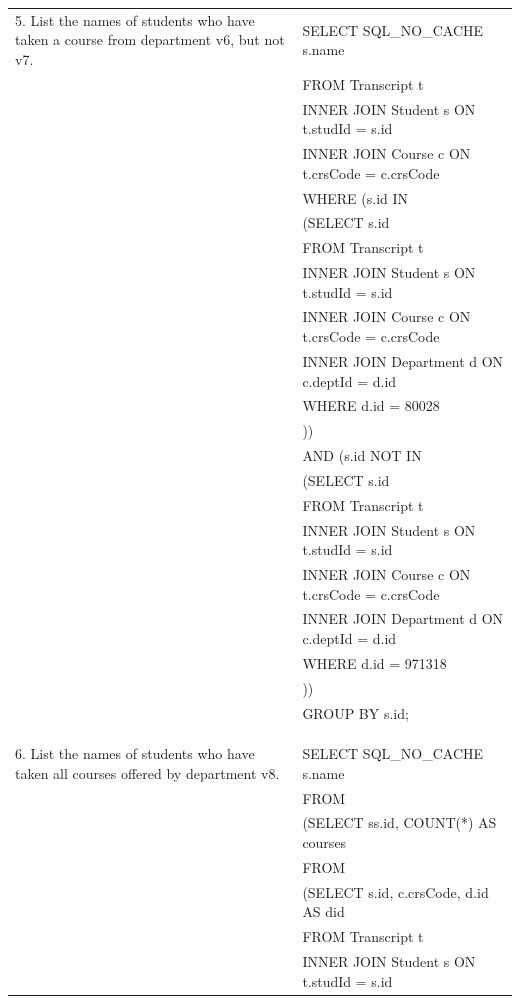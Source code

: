 \documentclass[11pt]{report}
\newcommand\tab[1][1cm]{\hspace*{#1}}
\begin{document}
	\begin{flushleft}
		\begin{tabular}{m{15em}|m{27.5em}}
			\multirow{1}{15em}{5. List the names of students who have taken a course from 
			department v6, but not v7.} 
			& SELECT SQL\_NO\_CACHE s.name \\ 
			& FROM Transcript t \\ 
			& INNER JOIN Student s ON t.studId = s.id \\
			& INNER JOIN Course c ON t.crsCode = c.crsCode \\
			& WHERE (s.id IN  \\
			& \tab (SELECT s.id \\
			& \tab FROM Transcript t \\
			& \tab INNER JOIN Student s ON t.studId = s.id \\
			& \tab INNER JOIN Course c ON t.crsCode = c.crsCode \\
			& \tab INNER JOIN Department d ON c.deptId = d.id \\
			& \tab WHERE d.id = 80028 \\
			& \tab )) \\
			& \tab AND (s.id NOT IN \\
			& \tab (SELECT s.id \\
			& \tab FROM Transcript t \\
			& \tab INNER JOIN Student s ON t.studId = s.id \\
			& \tab INNER JOIN Course c ON t.crsCode = c.crsCode \\
			& \tab INNER JOIN Department d ON c.deptId = d.id \\
			& \tab WHERE d.id = 971318 \\
			& \tab)) \\
			& GROUP BY s.id; \\
			&\\ 
			&\\
			&\\
			\multirow{1}{15em}{6. List the names of students who have taken all courses offered 
			by department v8.} 
			& SELECT SQL\_NO\_CACHE s.name \\ 
			& FROM \\ 
			& \tab (SELECT ss.id, COUNT(*) AS courses \\
			& \tab FROM \\
			& \tab\tab (SELECT s.id, c.crsCode, d.id AS did \\
			& \tab\tab FROM Transcript t \\
			& \tab\tab INNER JOIN Student s ON t.studId = s.id \\

\end{tabular}
\end{flushleft}
\end{document}
